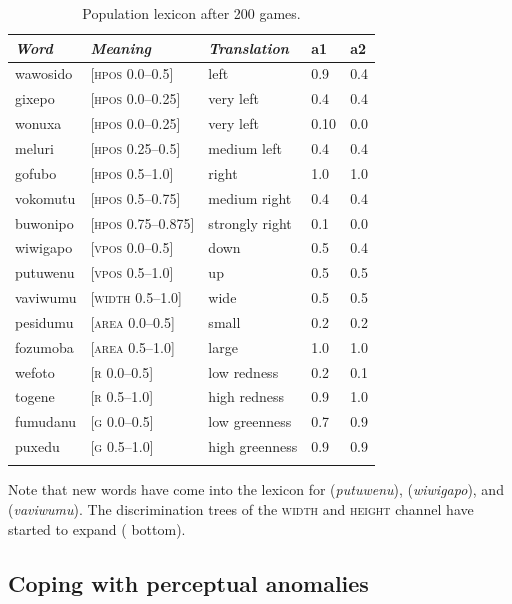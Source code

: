 \begin{table}
\begin{center}
\begin{tabular}{lllll}
\lsptoprule
{\itshape Word}&{\itshape Meaning}&{\itshape Translation} & {\bfshape a1}&{\bfshape a2} \\ \midrule
wawosido & [\textsc{hpos} 0.0–0.5] &left&0.9&0.4\\ 
gixepo & [\textsc{hpos} 0.0–0.25] & very left&0.4&0.4\\ 
wonuxa & [\textsc{hpos} 0.0–0.25] & very left&0.10&0.0\\ 
meluri & [\textsc{hpos} 0.25–0.5] &medium left&0.4&0.4\\ 
gofubo & [\textsc{hpos} 0.5–1.0]& right&1.0&1.0\\ 
vokomutu & [\textsc{hpos} 0.5–0.75] &medium right&0.4&0.4\\ 
buwonipo & [\textsc{hpos} 0.75–0.875] &strongly right&0.1&0.0\\ 
wiwigapo & [\textsc{vpos} 0.0–0.5] &down&0.5&0.4\\ 
putuwenu & [\textsc{vpos} 0.5–1.0]&up & 0.5&0.5\\ 
vaviwumu & [\textsc{width} 0.5–1.0]&wide & 0.5&0.5\\ 
pesidumu & [\textsc{area} 0.0–0.5]&small& 0.2&0.2\\ 
fozumoba & [\textsc{area} 0.5–1.0]&large & 1.0&1.0\\ 
wefoto & [\textsc{r} 0.0–0.5]& low redness &0.2&0.1\\ 
togene & [\textsc{r} 0.5–1.0]& high redness &0.9&1.0\\ 
fumudanu & [\textsc{g} 0.0–0.5]& low greenness &0.7&0.9\\ 
puxedu & [\textsc{g} 0.5–1.0]& high greenness &0.9&0.9\\ 
\lspbottomrule
\end{tabular}
\caption{\label{tab:upper}Population lexicon after 200 games.}
\end{center}
\end{table}
Note that new words have come into the lexicon 
for  (\textit{putuwenu}),  (\textit{wiwigapo}), and 
 (\textit{vaviwumu}). The discrimination trees of 
the \textsc{width} and \textsc{height} channel have started to 
expand ( bottom). 

\subsection{Coping with perceptual anomalies}

